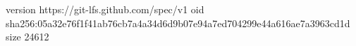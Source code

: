 version https://git-lfs.github.com/spec/v1
oid sha256:05a32e76f1f41ab76cb7a4a34d6d9b07e94a7ed704299e44a616ae7a3963cd1d
size 24612
